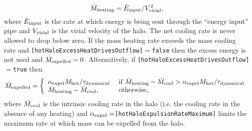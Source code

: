 \begin{equation}
 \dot{M}_{\rm heating} = \dot{E}_{\rm input} / V_{\rm virial}^2,
\end{equation}
where $\dot{E}_{\rm input}$ is the rate at which energy is being sent through the ``energy input'' pipe and $V_{\rm virial}$ is the virial velocity of the halo. The net cooling rate is never allowed to drop below zero. If the mass heating rate exceeds the mass cooling rate and {\tt [hotHaloExcessHeatDrivesOutflow]}$=${\tt false} then the excess energy is not used and $\dot{M}_{\rm expelled}=0$. Alternatively, if {\tt [hotHaloExcessHeatDrivesOutflow]}$=${\tt true} then
\begin{equation}
 \dot{M}_{\rm expelled} = \left\{ \begin{array}{ll} \alpha_{\rm expel} M_{\rm hot}/\tau_{\rm dynamical} & \hbox{ if } \dot{M}_{\rm heating} - \dot{M}_{\rm cool} > \alpha_{\rm expel} M_{\rm hot}/\tau_{\rm dynamical} \\ \dot{M}_{\rm heating} - \dot{M}_{\rm cool}, & \hbox{ otherwise,} \end{array} \right.
\end{equation}
where $\dot{M}_{\rm cool}$ is the intrinsic cooling rate in the halo (i.e. the cooling rate in the absence of any heating) and $\alpha_{\rm expel}=${\tt [hotHaloExpulsionRateMaximum]} limits the maximum rate at which mass can be expelled from the halo.

